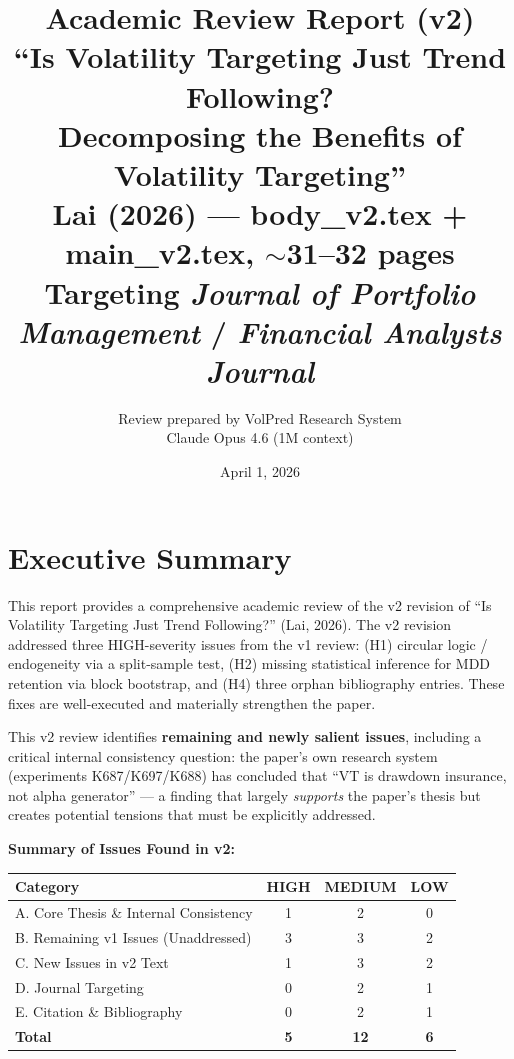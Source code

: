 \documentclass[12pt,a4paper]{article}
\title{Academic Review Report (v2)\\
\Large ``Is Volatility Targeting Just Trend Following?\\
Decomposing the Benefits of Volatility Targeting''\\[6pt]
\normalsize Lai (2026) --- body\_v2.tex + main\_v2.tex, $\sim$31--32 pages\\
\normalsize Targeting \textit{Journal of Portfolio Management} / \textit{Financial Analysts Journal}}
\author{Review prepared by VolPred Research System\\
\small Claude Opus 4.6 (1M context)}
\date{April 1, 2026}
\begin{document}
\maketitle

\tableofcontents
\newpage

\section{Executive Summary}

This report provides a comprehensive academic review of the v2 revision of ``Is Volatility Targeting Just Trend Following?'' (Lai, 2026). The v2 revision addressed three HIGH-severity issues from the v1 review: (H1) circular logic / endogeneity via a split-sample test, (H2) missing statistical inference for MDD retention via block bootstrap, and (H4) three orphan bibliography entries. These fixes are well-executed and materially strengthen the paper.

This v2 review identifies \textbf{remaining and newly salient issues}, including a critical internal consistency question: the paper's own research system (experiments K687/K697/K688) has concluded that ``VT is drawdown insurance, not alpha generator'' --- a finding that largely \textit{supports} the paper's thesis but creates potential tensions that must be explicitly addressed.

\medskip
\noindent\textbf{Summary of Issues Found in v2:}

\begin{center}
\begin{tabular}{lccc}
\toprule
Category & HIGH & MEDIUM & LOW \\
\midrule
A. Core Thesis \& Internal Consistency   & 1 & 2 & 0 \\
B. Remaining v1 Issues (Unaddressed)     & 3 & 3 & 2 \\
C. New Issues in v2 Text                 & 1 & 3 & 2 \\
D. Journal Targeting                     & 0 & 2 & 1 \\
E. Citation \& Bibliography              & 0 & 2 & 1 \\
\midrule
\textbf{Total}                           & \textbf{5} & \textbf{12} & \textbf{6} \\
\bottomrule
\end{tabular}
\end{center}
\end{document}
